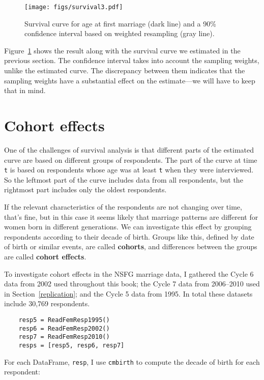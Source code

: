 \documentclass[12pt]{book}
\begin{document}
\begin{figure}
\centerline{\texttt{[image: figs/survival3.pdf]}}
\caption{Survival curve for age at first marriage (dark line) and a 90\%
confidence interval based on weighted resampling (gray line).}
\label{survival3}
\end{figure}

Figure~\ref{survival3} shows the result along with the survival
curve we estimated in the previous section.  The confidence
interval takes into account the sampling weights, unlike the estimated
curve.  The discrepancy between them indicates that the sampling
weights have a substantial effect on the estimate---we will have
to keep that in mind.


\section{Cohort effects}

One of the challenges of survival analysis is that different parts
of the estimated curve are based on different groups of respondents.
The part of the curve at time {\tt t} is based on respondents
whose age was at least {\tt t} when they were interviewed.
So the leftmost part of the curve includes data from all respondents,
but the rightmost part includes only the oldest respondents.

If the relevant characteristics of the respondents are not changing
over time, that's fine, but in this case it seems likely that marriage
patterns are different for women born in different generations.
We can investigate this effect by grouping respondents according
to their decade of birth.  Groups like this, defined by date of
birth or similar events, are called {\bf cohorts}, and differences
between the groups are called {\bf cohort effects}.

To investigate cohort effects in the NSFG marriage data, I gathered
the Cycle 6 data from 2002 used throughout this book;
the Cycle 7 data from 2006--2010 used in Section~\ref{replication};
and the Cycle 5 data from 1995.  In total these datasets include
30,769 respondents.

\begin{verbatim}
    resp5 = ReadFemResp1995()
    resp6 = ReadFemResp2002()
    resp7 = ReadFemResp2010()
    resps = [resp5, resp6, resp7]
\end{verbatim}

For each DataFrame, {\tt resp}, I use {\tt cmbirth} to compute the
decade of birth for each respondent:
\end{document}
